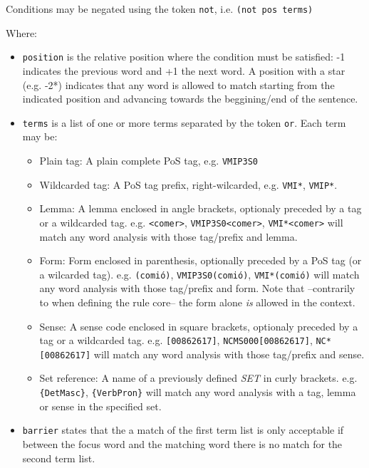 \documentclass[a4paper]{book}
\begin{document}
\begin{itemize}
        Conditions may be negated using the token {\tt not},
         i.e. {\tt (not pos terms)}

	Where: 
	\begin{itemize}
	\item {\tt position} is the relative position where the condition
	  must be satisfied: -1 indicates the previous word and +1 the
	  next word. A position with a star (e.g. -2*) indicates that
	  any word is allowed to match starting from the indicated
	  position and advancing towards the beggining/end of the sentence.
 	\item {\tt terms} is a list of one or more terms separated by
 	the token {\tt or}. Each term may be:
    	   \begin{itemize}
  	     \item Plain tag:  A plain complete PoS tag,  e.g. {\tt VMIP3S0}
	     \item Wildcarded tag:  A PoS tag prefix, right-wilcarded, 
               e.g. {\tt VMI*}, {\tt VMIP*}. 
	     \item Lemma: A lemma enclosed in angle brackets, optionaly
	       preceded by a tag or a wildcarded tag.
	       e.g.  \verb#<comer>#, \verb#VMIP3S0<comer>#,
	       \verb#VMI*<comer># will match any
	       word analysis with those tag/prefix and lemma.
	     \item Form: Form enclosed in parenthesis, optionally
	       preceded by a PoS tag (or a wilcarded tag).
	       e.g.  {\tt (comi\'o)}, {\tt VMIP3S0(comi\'o)}, 
               {\tt VMI*(comi\'o)} will match any
	       word analysis with those tag/prefix and form.
               Note that --contrarily to when defining the rule core-- 
               the form alone {\em is} allowed in the context.
    	     \item Sense: A sense code enclosed in square brackets, optionaly
	       preceded by a tag or a wildcarded tag.
	       e.g.  \verb#[00862617]#, \verb#NCMS000[00862617]#, 
               \verb#NC*[00862617]# will match any
	       word analysis with those tag/prefix and sense.
    	     \item Set reference: A name of a previously defined {\em SET}
	       in curly brackets.
	       e.g.  \verb#{DetMasc}#, \verb#{VerbPron}#  will match any
	       word analysis with a tag, lemma or sense in the
	       specified set.
	   \end{itemize}

	\item {\tt barrier} states that the a match of the first term
	list is only acceptable if between the focus word and the
	matching word there is no match for the second term list.
	\end{itemize}
    \end{itemize}
\end{document}
